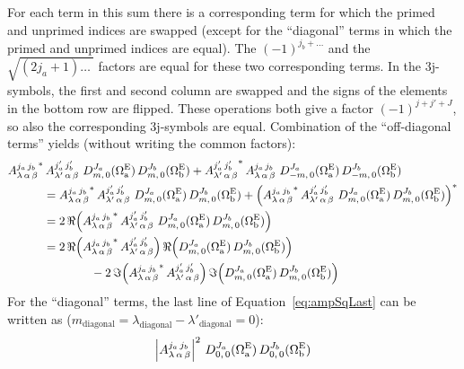 For each term in this sum there is a corresponding term for which the primed and unprimed indices
are swapped (except for the ``diagonal'' terms in which the primed and unprimed indices are equal).
The $(-1)^{j_b+\ldots}$ and the $\sqrt{(2j_a+1)\ldots\ }$ factors are equal for these two
corresponding terms. In the 3j-symbols, the first and second column are swapped and the signs of
the elements in the bottom row are flipped. These operations both give a factor $(-1)^{j+j'+J}$, so
also the corresponding 3j-symbols are equal. Combination of the ``off-diagonal terms'' yields
(without writing the common factors):
\begin{equation}\begin{split}\label{eq:angOffDiagonal}
  &{A_{\lambda\,\alpha\,\beta}^{j_a\,j_b}}^*\, A_{\lambda'\,\alpha\,\beta}^{j_a'\,j_b'}\
    D_{m,\,0}^{J_a}(\EulSet[a])\, D_{m,\,0}^{J_b}(\EulSet[b])
    + {A_{\lambda'\,\alpha\,\beta}^{j_a'\,j_b'}}^*\, A_{\lambda\,\alpha\,\beta}^{j_a\,j_b}\
    D_{-m,\,0}^{J_a}(\EulSet[a])\, D_{-m,\,0}^{J_b}(\EulSet[b])
  \\&\qquad\quad=
  {A_{\lambda\,\alpha\,\beta}^{j_a\,j_b}}^*\, A_{\lambda'\,\alpha\,\beta}^{j_a'\,j_b'}\
    D_{m,\,0}^{J_a}(\EulSet[a])\, D_{m,\,0}^{J_b}(\EulSet[b])
    + \left(
      {A_{\lambda\,\alpha\,\beta}^{j_a\,j_b}}^*\, A_{\lambda'\,\alpha\,\beta}^{j_a'\,j_b'}\
      D_{m,\,0}^{J_a}(\EulSet[a])\, D_{m,\,0}^{J_b}(\EulSet[b])
    \right)^*
  \\&\qquad\quad=
  2\,\Re\!\left(
      {A_{\lambda\,\alpha\,\beta}^{j_a\,j_b}}^*\, A_{\lambda'\,\alpha\,\beta}^{j_a'\,j_b'}\
      D_{m,\,0}^{J_a}(\EulSet[a])\, D_{m,\,0}^{J_b}(\EulSet[b])
    \right)
  \\&\qquad\quad=
  2\,\Re\!\left(
      {A_{\lambda\,\alpha\,\beta}^{j_a\,j_b}}^*\, A_{\lambda'\,\alpha\,\beta}^{j_a'\,j_b'}
    \right)\Re\!\left(
      D_{m,\,0}^{J_a}(\EulSet[a])\, D_{m,\,0}^{J_b}(\EulSet[b])
    \right)
  \\&\qquad\qquad\qquad\quad-
  2\,\Im\!\left(
      {A_{\lambda\,\alpha\,\beta}^{j_a\,j_b}}^*\, A_{\lambda'\,\alpha\,\beta}^{j_a'\,j_b'}
    \right)\Im\!\left(
      D_{m,\,0}^{J_a}(\EulSet[a])\, D_{m,\,0}^{J_b}(\EulSet[b])
    \right)
\end{split}\end{equation}
%
For the ``diagonal'' terms, the last line of Equation~\ref{eq:ampSqLast} can be written as
($m_\text{diagonal} = \lambda_\text{diagonal}-\lambda'_\text{diagonal} = 0$):
%
\begin{equation}\label{eq:angDiagonal}
  \left|A_{\lambda\,\alpha\,\beta}^{j_a\,j_b}\right|^2\,
  D_{0,\,0}^{J_a}(\EulSet[a])\, D_{0,\,0}^{J_b}(\EulSet[b])
\end{equation}

